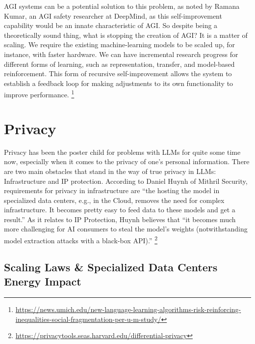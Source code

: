 \documentclass[
]{book}
\begin{document}
AGI systems can be a potential solution to this problem, as noted by Ramana Kumar, an AGI safety researcher at DeepMind, as this self-improvement capability would be an innate characteristic of AGI. So despite being a theoretically sound thing, what is stopping the creation of AGI? It is a matter of scaling.
We require the existing machine-learning models to be scaled up, for instance, with faster hardware. We can have incremental research progress for different forms of learning, such as representation, transfer, and model-based reinforcement. This form of recursive self-improvement allows the system to establish a feedback loop for making adjustments to its own functionality to improve performance. \footnote{\url{https://news.umich.edu/new-language-learning-algorithms-risk-reinforcing-inequalities-social-fragmentation-per-u-m-study/}}

\hypertarget{privacy}{%
\chapter{Privacy}\label{privacy}}

Privacy has been the poster child for problems with LLMs for quite some time now, especially when it comes to the privacy of one's personal information. There are two main obstacles that stand in the way of true privacy in LLMs: Infrastructure and IP protection. According to Daniel Huynh of Mithril Security, requirements for privacy in infrastructure are ``the hosting the model in specialized data centers, e.g., in the Cloud, removes the need for complex infrastructure. It becomes pretty easy to feed data to these models and get a result.'' As it relates to IP Protection, Huynh believes that ``it becomes much more challenging for AI consumers to steal the model's weights (notwithstanding model extraction attacks with a black-box API).'' \footnote{\url{https://privacytools.seas.harvard.edu/differential-privacy}}

\hypertarget{scaling-laws-specialized-data-centers-energy-impact}{%
\section{Scaling Laws \& Specialized Data Centers Energy Impact}\label{scaling-laws-specialized-data-centers-energy-impact}}
\end{document}
